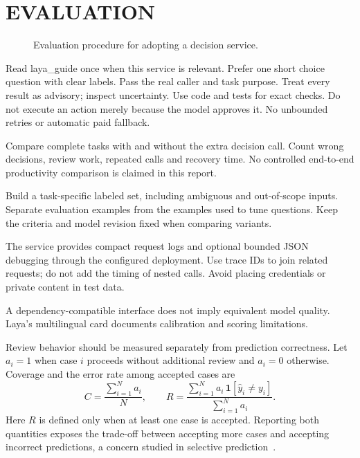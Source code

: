 \documentclass[10pt,a4paper]{article}
\begin{document}
\section{EVALUATION}
\begin{figure}[H]
\centering
{}
\caption{Evaluation procedure for adopting a decision service.}
\end{figure}
\begin{Code}
Read laya_guide once when this service is relevant.
Prefer one short choice question with clear labels.
Pass the real caller and task purpose.
Treat every result as advisory; inspect uncertainty.
Use code and tests for exact checks.
Do not execute an action merely because the model approves it.
No unbounded retries or automatic paid fallback.
\end{Code}
Compare complete tasks with and without the extra decision call. Count wrong decisions, review work, repeated calls and recovery time. No controlled end-to-end productivity comparison is claimed in this report.

Build a task-specific labeled set, including ambiguous and out-of-scope inputs. Separate evaluation examples from the examples used to tune questions. Keep the criteria and model revision fixed when comparing variants.

The service provides compact request logs and optional bounded JSON debugging through the configured deployment. Use trace IDs to join related requests; do not add the timing of nested calls. Avoid placing credentials or private content in test data.

A dependency-compatible interface does not imply equivalent model quality. Laya's multilingual card documents calibration and scoring limitations. \cite{r3}


Review behavior should be measured separately from prediction correctness. Let $a_i=1$ when case $i$ proceeds without additional review and $a_i=0$ otherwise. Coverage and the error rate among accepted cases are
\begin{equation}
 C=\frac{\sum_{i=1}^{N}a_i}{N},
 \qquad R=\frac{\sum_{i=1}^{N}a_i\,\mathbf{1}[\hat{y}_i\ne y_i]}{\sum_{i=1}^{N}a_i}.
 \label{eq:coverage}
\end{equation}
Here $R$ is defined only when at least one case is accepted. Reporting both quantities exposes the trade-off between accepting more cases and accepting incorrect predictions, a concern studied in selective prediction~\cite{r9}.
\end{document}

